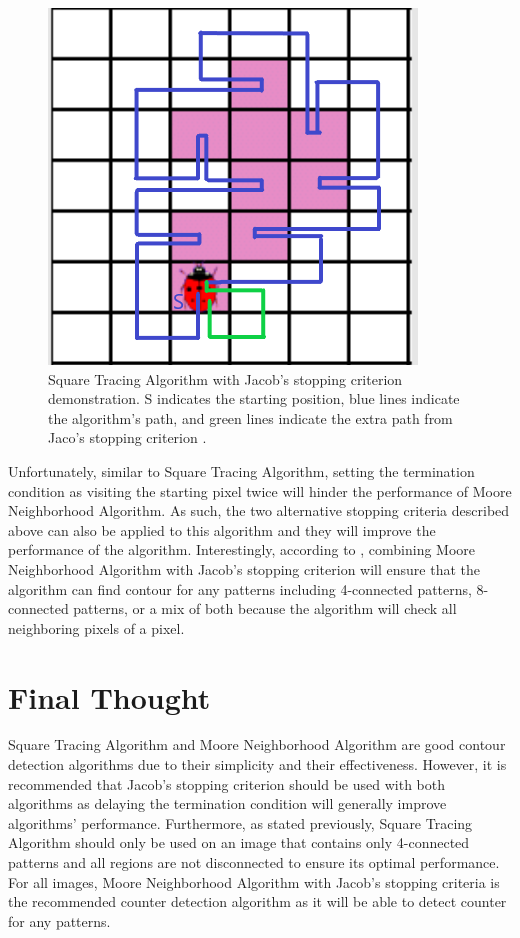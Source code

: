 \documentclass[conference]{IEEEtran}
\begin{document}
\begin{figure}[!htb]
    \centering
    \includegraphics[scale = 0.5]{fig5.png}
    \caption{Square Tracing Algorithm with Jacob's stopping criterion demonstration. S indicates the starting position, blue lines indicate the algorithm's path, and green lines indicate the extra path from Jaco's stopping criterion \cite{mnt:2000}.}
\end{figure}

Unfortunately, similar to Square Tracing Algorithm, setting the termination condition as visiting the starting pixel twice will hinder the performance of Moore Neighborhood Algorithm. As such, the two alternative stopping criteria described above can also be applied to this algorithm and they will improve the performance of the algorithm. Interestingly, according to \cite{mnt:2000}, combining Moore Neighborhood Algorithm with Jacob's stopping criterion will ensure that the algorithm can find contour for any patterns including 4-connected patterns, 8-connected patterns, or a mix of both because the algorithm will check all neighboring pixels of a pixel.

\section{Final Thought}
Square Tracing Algorithm and Moore Neighborhood Algorithm are good contour detection algorithms due to their simplicity and their effectiveness. However, it is recommended that Jacob's stopping criterion should be used with both algorithms as delaying the termination condition will generally improve algorithms' performance. Furthermore, as stated previously, Square Tracing Algorithm should only be used on an image that contains only 4-connected patterns and all regions are not disconnected to ensure its optimal performance. For all images, Moore Neighborhood Algorithm with Jacob's stopping criteria is the recommended counter detection algorithm as it will be able to detect counter for any patterns.

\printbibliography
\end{document}
